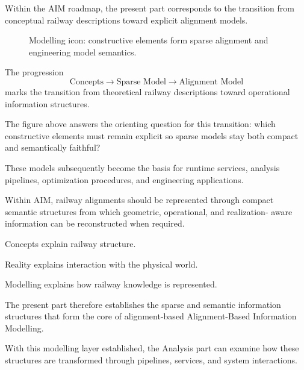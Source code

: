 Within the AIM roadmap, the present part corresponds to the transition
from conceptual railway descriptions toward explicit alignment models.

\begin{figure}[ht]
\centering

\caption{Modelling icon: constructive elements form sparse alignment and engineering model semantics.}
\label{fig:icon-modeling-constructive-sparse}
\end{figure}

The progression
\[
\text{Concepts}
\rightarrow
\text{Sparse Model}
\rightarrow
\text{Alignment Model}
\]
marks the transition from theoretical railway descriptions toward
operational information structures.

The figure above answers the orienting question for this transition:
which constructive elements must remain explicit so sparse models stay
both compact and semantically faithful?

These models subsequently become the basis for runtime services,
analysis pipelines, optimization procedures, and engineering
applications.

\begin{principle}
\label{princ:sparse-modeling}
Within AIM, railway alignments should be represented through compact
semantic structures from which geometric, operational, and realization-
aware information can be reconstructed when required.
\end{principle}

\begin{summary}
Concepts explain railway structure.

Reality explains interaction with the physical world.

Modelling explains how railway knowledge is represented.

The present part therefore establishes the sparse and semantic
information structures that form the core of alignment-based
Alignment-Based Information Modelling.
\end{summary}

With this modelling layer established, the Analysis part can examine how
these structures are transformed through pipelines, services, and system
interactions.
